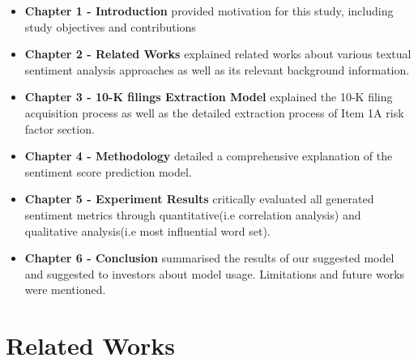 \documentclass[logo,bsc,singlespacing,parskip]{infthesis}
\begin{document}
\begin{itemize}
    \item \textbf{Chapter 1 - Introduction} provided motivation for this study, including study objectives and contributions
\end{itemize}

\begin{itemize}
    \item \textbf{Chapter 2 - Related Works} explained related works about various textual sentiment analysis approaches as well as its relevant background information.  
\end{itemize}

\begin{itemize}
    \item \textbf{Chapter 3 - 10-K filings Extraction Model} explained the 10-K filing acquisition process as well as the detailed extraction process of Item 1A risk factor section.
\end{itemize}

\begin{itemize}
    \item \textbf{Chapter 4 - Methodology} detailed a comprehensive explanation of the sentiment score prediction model.
\end{itemize}

\begin{itemize}
    \item \textbf{Chapter 5 - Experiment Results} critically evaluated all generated sentiment metrics through quantitative(i.e correlation analysis) and qualitative analysis(i.e most influential word set). 
\end{itemize}

\begin{itemize}
    \item \textbf{Chapter 6 - Conclusion} summarised the results of our suggested model and suggested to investors about model usage. Limitations and future works were mentioned.  
\end{itemize}






\chapter{Related Works}
\end{document}
